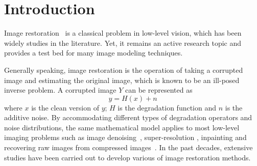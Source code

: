 


\section{Introduction}




Image restoration~\cite{DBLP:conf/iccv/MairalBPSZ09,DBLP:journals/tip/DongZSL13,
DBLP:journals/pami/SchmidtJNRR16,DBLP:conf/cvpr/SchmidtR14,DBLP:conf/iccv/ZoranW11}
is a classical problem in low-level vision, which has been widely studies in the literature.
Yet, it remains an active research topic and provides a test bed for many image modeling techniques.

Generally speaking, image restoration is the operation of taking a corrupted image and
estimating the original image, which is known to be an ill-posed inverse problem. A corrupted
image $Y$ can be represented as
\begin{equation}
    y = H(x) + n
\end{equation}
where $x$ is the clean version of $y$;  $H$ is the degradation function and $n$ is the additive
noise. By accommodating different types of degradation operators and noise distributions, the same mathematical model
applies to most  low-level imaging problems such as image denoising~\cite{DBLP:conf/cvpr/LiuXZG15,
DBLP:conf/iccv/ChenZY15,DBLP:conf/iccv/XuZZZF15,DBLP:conf/cvpr/GuZZF14}, super-resolution
    \cite{DBLP:conf/accv/TimofteSG14,DBLP:conf/cvpr/YangLC13,DBLP:conf/cvpr/ZhuZY14,DBLP:conf/cvpr/ZhuZ0Y15,
DBLP:conf/iccv/RieglerSRB15,DBLP:conf/iccv/GuZXMFZ15,DBLP:conf/iccv/WangLYHH15}, inpainting
    \cite{DBLP:conf/nips/XieXC12,DBLP:journals/ijcv/RothB09,DBLP:journals/tip/MairalES08} and recovering raw
images from compressed images~\cite{DBLP:conf/iccv/DongDLT15,DBLP:journals/tip/FoiKE07,DBLP:conf/eccv/JancsaryNR12}.
In the past decades, extensive studies have been carried out to develop various of image restoration methods.




